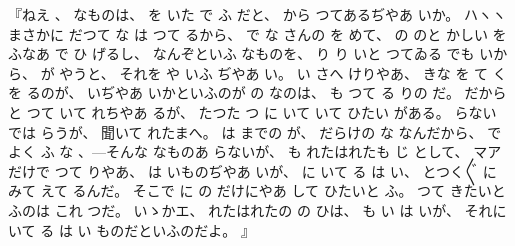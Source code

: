 『ねえ
、
%
なものは、
%
を
いた
で
ふ
だと、
%
から
つてあるぢやあ
いか。
%
ハヽヽまさかに
だつて
な
は
つて
るから、
%
で
な
さんの
を
めて、
%
の
のと
かしい
を
ふなあ
で
ひ
げるし、
%
なんぞといふ
なものを、
%
り
り
いと
つてゐる
でも
いから、
%
が
やうと、
%
それを
や
いふ
ぢやあ
い。
%
い
さへ
けりやあ、
%
きな
を
て
く
を
るのが、
%
いぢやあ
いかといふのが
の
なのは、
%
も
つて
る
りの
だ。
%
だから
と
つて
いて
れちやあ
るが、
%
たつた
つ
に
いて
いて
ひたい
がある。
%
らない
では
らうが、
%
聞いて
れたまへ。
%
は
までの
が、
%
だらけの
な
なんだから、
%
でよく
ふ
な
、{---}そんな
なものあ
らないが、
%
も
れたはれたも
じ
として、
%
マア
だけで
つて
りやあ、
%
は
いものぢやあ
いが、
%
に
いて
る
は
い、
%
とつく〴〵
に
みて
えて
るんだ。
%
そこで
に
の
だけにやあ
して
ひたいと
ふ。
%
つて
きたいと
ふのは
これ
つだ。
%
いゝかエ、
%
れたはれたの
の
ひは、
%
も
い
は
いが、
%
それに
いて
る
は
い
ものだといふのだよ。
』

